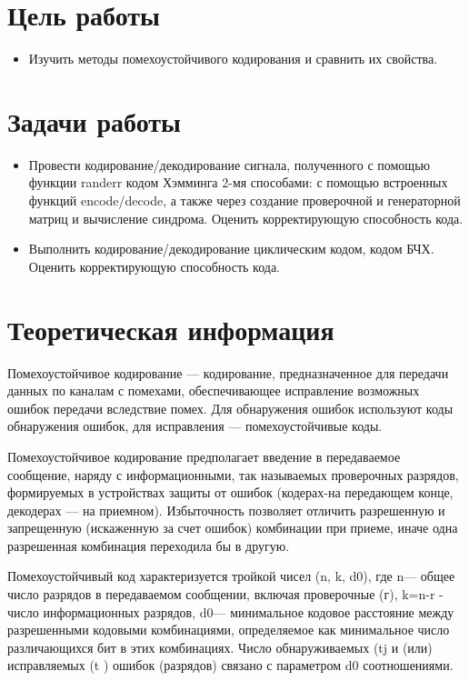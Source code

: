 
\usepackage{minted}




\setcounter{page}{2}


\section{Цель работы}
\begin{itemize}
	\item Изучить методы помехоустойчивого кодирования и сравнить их свойства.
\end{itemize}
\section{Задачи работы}
\begin{itemize}
	\item Провести кодирование/декодирование сигнала, полученного с помощью функции randerr кодом Хэмминга 2-мя способами: с помощью встроенных функций encode/decode, а также через создание проверочной и генераторной матриц и вычисление синдрома. Оценить корректирующую способность кода.
	\item Выполнить кодирование/декодирование циклическим кодом, кодом БЧХ. Оценить корректирующую способность кода.
\end{itemize}

\section{Теоретическая информация}
Помехоустойчивое кодирование — кодирование, предназначенное для передачи данных по каналам с помехами, обеспечивающее исправление возможных ошибок передачи вследствие помех. Для обнаружения ошибок используют коды обнаружения ошибок, для исправления — помехоустойчивые коды.

Помехоустойчивое кодирование предполагает введение в передаваемое сообщение, наряду с информационными, так называемых проверочных разрядов, формируемых в устройствах защиты от ошибок (кодерах-на передающем конце, декодерах — на приемном). Избыточность позволяет отличить разрешенную и запрещенную (искаженную за счет ошибок) комбинации при приеме, иначе одна разрешенная комбинация переходила бы в другую.

Помехоустойчивый код характеризуется тройкой чисел (n, k, d0), где n— общее число разрядов в передаваемом сообщении, включая проверочные (г), k=n-r - число информационных разрядов, d0— минимальное кодовое расстояние между разрешенными кодовыми комбинациями, определяемое как минимальное число различающихся бит в этих комбинациях. Число обнаруживаемых (tj и (или) исправляемых (t ) ошибок (разрядов) связано с параметром d0 соотношениями.

